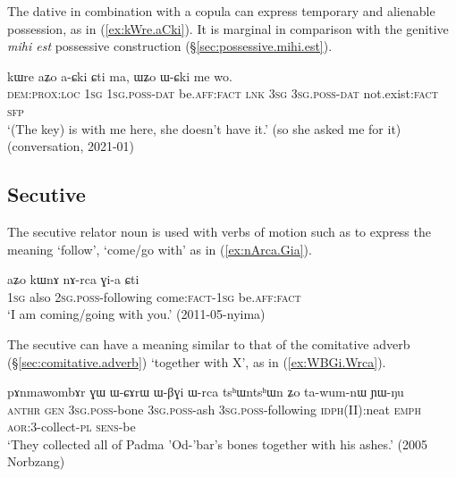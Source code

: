 The dative in combination with a copula can express temporary and alienable possession, as in (\ref{ex:kWre.aCki}). It is marginal in comparison with the genitive \textit{mihi est} possessive construction (§\ref{sec:possessive.mihi.est}).

\begin{exe}
	\ex \label{ex:kWre.aCki}
	\gll kɯre aʑo a-ɕki ɕti ma, ɯʑo ɯ-ɕki me wo. \\
	\textsc{dem}:\textsc{prox}:\textsc{loc} \textsc{1sg} \textsc{1sg}.\textsc{poss}-\textsc{dat} be.\textsc{aff}:\textsc{fact} \textsc{lnk} \textsc{3sg} \textsc{3sg}.\textsc{poss}-\textsc{dat} not.exist:\textsc{fact} \textsc{sfp} \\
	\glt `(The key) is with me here, she doesn't have it.' (so she asked me for it) (conversation, 2021-01)
\end{exe}

\subsection{Secutive} \label{sec:secutive} 
The secutive relator noun  is used with verbs of motion such as  to express the meaning `follow', `come/go with' as in (\ref{ex:nArca.Gia}).

\begin{exe}
\ex \label{ex:nArca.Gia}
 \gll  aʑo kɯnɤ nɤ-rca ɣi-a ɕti \\
 \textsc{1sg} also \textsc{2sg}.\textsc{poss}-following come:\textsc{fact}-\textsc{1sg} be.\textsc{aff}:\textsc{fact} \\
\glt `I am coming/going with you.' (2011-05-nyima)
\end{exe}

The secutive can have a meaning similar to that of the comitative adverb (§\ref{sec:comitative.adverb}) `together with X', as in (\ref{ex:WBGi.Wrca}).

\begin{exe}
\ex \label{ex:WBGi.Wrca}
 \gll  pɤnmawombɤr ɣɯ ɯ-ɕɤrɯ ɯ-βɣi ɯ-rca tsʰɯntsʰɯn ʑo ta-wum-nɯ ɲɯ-ŋu \\ 
\textsc{anthr} \textsc{gen} \textsc{3sg}.\textsc{poss}-bone \textsc{3sg}.\textsc{poss}-ash \textsc{3sg}.\textsc{poss}-following \textsc{idph}(II):neat \textsc{emph} \textsc{aor}:3\flobv{}-collect-\textsc{pl} \textsc{sens}-be  \\
\glt `They collected all of Padma 'Od-'bar's bones together with his ashes.' (2005 Norbzang)
\end{exe}

